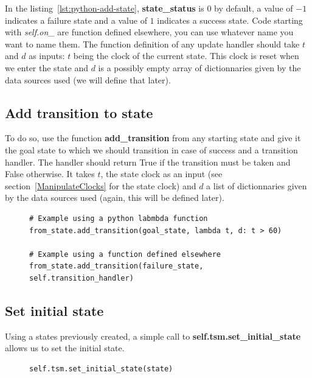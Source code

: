 \documentclass[12pt]{article}
\theoremstyle{definition}
\theoremstyle{definition}
\theoremstyle{remark}
\begin{document}
In the listing~\ref{lst:python-add-state}, \textbf{state\_status} is $0$ by default, a value of $-1$ indicates a failure state and a value of $1$ indicates a success state. Code starting with \textit{self.on\_} are function defined elsewhere, you can use whatever name you want to name them. The function definition of any update handler should take $t$ and $d$ as inputs: $t$ being the clock of the current state. This clock is reset when we enter the state and $d$ is a possibly empty array of dictionnaries given by the data sources used (we will define that later).



\subsection{Add transition to state}

To do so, use the function \textbf{add\_transition} from any starting state and give it the goal state to which we should transition in case of success and a transition handler. The handler should return True if the transition must be taken and False otherwise. It takes $t$, the state clock as an input (see section~\ref{ManipulateClocks} for the state clock) and $d$ a list of dictionnaries given by the data sources used (again, this will be defined later).

\begin{figure}[H]
    \begin{lstlisting}[caption="Add transition to any state",label={lst:python-add-transition}]
# Example using a python labmbda function
from_state.add_transition(goal_state, lambda t, d: t > 60)

# Example using a function defined elsewhere
from_state.add_transition(failure_state, self.transition_handler)
    \end{lstlisting}
\end{figure}


\subsection{Set initial state}

Using a states previously created, a simple call to \textbf{self.tsm.set\_initial\_state} allows us to set the initial state.

\begin{figure}[H]
    \begin{lstlisting}[caption="Set the initial state",label={lst:python-set-initial-state}]
self.tsm.set_initial_state(state)
    \end{lstlisting}
\end{figure}
\end{document}
